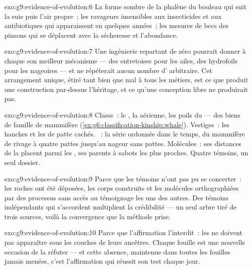 \begin{solution}{exo:g9:evidence-of-evolution:6}
La forme sombre de la phalène du bouleau qui suit la suie
puis l'air propre~; les ravageurs insensibles aux
insecticides et aux antibiotiques qui apparaissent en
quelques années~; les mesures de becs des pinsons qui se
déplacent avec la sécheresse et l'abondance.
\end{solution}

\begin{solution}{exo:g9:evidence-of-evolution:7}
Une ingénierie repartant de zéro pourrait donner à chaque
 son meilleur mécanisme --- des entretoises pour les
ailes, des hydrofoils pour les nageoires --- et ne
répéterait aucun nombre d' arbitraire. Cet arrangement
unique, étiré tant bien que mal à tous les métiers, est ce
que produit une construction par-dessus l'héritage, et ce
qu'une conception libre ne produirait pas.
\end{solution}

\begin{solution}{exo:g9:evidence-of-evolution:8}
Classe~: le , la  aérienne, les poils du
 --- des biens de famille de mammifère
(\cref{ex:g6:classification-kinship:whale}). Vestiges~: les
hanches et les  de patte cachés. ~: la série
ordonnée dans le temps, du mammifère de rivage à quatre
pattes jusqu'au nageur sans pattes. Molécules~: ses
distances de  la placent parmi les , ses
parents à sabots les plus proches. Quatre témoins, un seul
dossier.
\end{solution}

\begin{solution}{exo:g9:evidence-of-evolution:9}
Parce que les témoins n'ont pas pu se concerter~: les roches
ont été déposées, les corps construits et les molécules
orthographiées par des processus sans accès au témoignage
les uns des autres. Des témoins indépendants qui s'accordent
multiplient la crédibilité --- un seul arbre tiré de trois
sources, voilà la convergence que la méthode prise.
\end{solution}

\begin{solution}{exo:g9:evidence-of-evolution:10}
Parce que l'affirmation l'interdit~: les  ne
doivent pas apparaître sous les couches de leurs ancêtres.
Chaque fouille est une nouvelle occasion de la réfuter ---
et cette absence, maintenue dans toutes les fouilles jamais
menées, c'est l'affirmation qui réussit son test chaque jour.
\end{solution}

